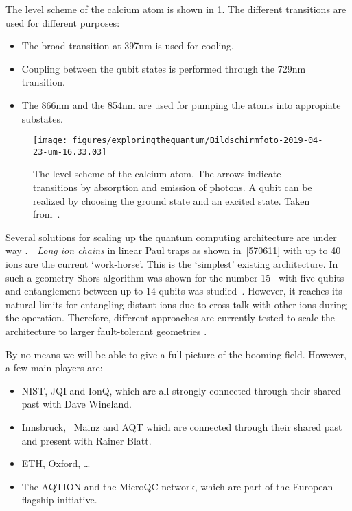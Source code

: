 \documentclass[10pt]{article}
\let\cite\citep
\providecommand\citep{\cite}
\begin{document}
The level scheme of the calcium atom is shown in \ref{652265}. The different transitions are used for different purposes:
\begin{itemize}
\item The broad transition at 397nm is used for cooling.
\item Coupling between the qubit states is performed through the 729nm transition.
\item The 866nm and the 854nm are used for pumping the atoms into appropiate substates.
\end{itemize}
\begin{figure}[h!]
\begin{center}
\texttt{[image: figures/exploringthequantum/Bildschirmfoto-2019-04-23-um-16.33.03]}
\caption{{The level scheme of the calcium atom. The arrows indicate transitions by
absorption and emission of photons. A qubit can be realized by choosing
the ground state and an excited state. Taken from~\protect\cite{Schindler_2013}.
{\label{652265}}%
}}
\end{center}
\end{figure}

Several solutions for scaling up the quantum computing architecture are
under way .~~\emph{Long ion chains} in linear Paul traps as shown
in~{\ref{570611}} with up to 40 ions are the current
`work-horse'. This is the `simplest' existing architecture. In such a
geometry Shors algorithm was shown for the number 15~\cite{Monz_2016}
with five qubits and entanglement between up to 14 qubits was
studied~\cite{Monz_2011}. However, it reaches its natural limits for
entangling distant ions due to cross-talk with other ions during the
operation. Therefore, different approaches are currently tested to scale
the architecture to larger fault-tolerant geometries \cite{Bermudez_2017}.

By no means we will be able to give a full picture of the booming field.
However, a few main players are:

\begin{itemize}
\tightlist
\item
  NIST, JQI and IonQ, which are all strongly connected through their
  shared past with Dave Wineland.
\item
  Innsbruck,~ Mainz and AQT which are connected through their shared
  past and present with Rainer Blatt.
\item
  ETH, Oxford, \ldots{}
\item
  The AQTION and the MicroQC network, which are part of the European
  flagship initiative.
\end{itemize}

\FloatBarrier


\end{document}
